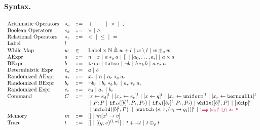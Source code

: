 \documentclass[a4paper,11pt]{article}
\begin{document}
\paragraph{Syntax.}
\[
\begin{array}{llll}
 \mbox{Arithmatic Operators} & *_a & ::= & + ~|~ - ~|~ \times 
%
~|~ \div \\  
  \mbox{Boolean Operators} & *_b & ::= & \lor \sep \land \\
   \mbox{Relational Operators} & *_r & ::= & < ~|~ \leq ~|~ = \\  
 \mbox{Label} & l & & \\ 
 \mbox{While Map} & w & \in & \mbox{Label} \times \mathbb{N} \triangleq w +l \sep w \setminus l \sep w \oplus_\rho w \\
\mbox{AExpr} & \aexpr & ::= & 
	n ~|~ x ~|~ \aexpr *_a \aexpr ~|~ {[] ~|~ [\aexpr_0, \dots, \aexpr_i] \sep \aexpr \times \aexpr } \\
\mbox{BExpr} & \bexpr & ::= & 
	\etrue ~|~ \efalse  ~|~ \neg \bexpr
	 ~|~ \bexpr *_b \bexpr
	~|~ \aexpr *_r \aexpr \\
\mbox{Deterministic Expr} & \expr_d & ::=	& \aexpr \sep \bexpr \\
\mbox{Randomized AExpr} & \aexpr_r & ::= & 
	 x_r \sep n \sep  \aexpr_r *_a \aexpr_r \\
\mbox{Randomized BExpr} & \bexpr_r & ::= & 
\neg \bexpr_r
	 ~|~ \bexpr_r *_b \bexpr_r
	~|~ \aexpr_r *_r \aexpr_r \\
\mbox{Randomized Expr} & \expr_r & ::=	& \expr_d \sep \aexpr_r \sep \bexpr_r \\
\mbox{Command} & C & ::= &   [\assign x {\expr_d}]^{l} \sep [\assign {x_r} {\expr_r}]^{l} \sep  [\assign x q]^{l} \sep  [\assign {x_r} \uniform ]^{l} \sep   [\assign {x_r} \bernoulli]^{l} 
\\
& & & ~|~  \command ; \command  ~|~ \eif_D ([\bexpr]^{l}, \command_1, \command_2) \sep  \eif_R ([\bexpr_r]^{l}, \command_1, \command_2) 
	~|~ \ewhile([\bexpr]^{l}, \command) ~|~ [\eskip]^{l} \\
& & &	~|~ {\eunfold{[\bexpr]^{l}}{\command} \sep [\eswitch( \expr, x, (v_i \to  q_i))]^{l}} \sep \jl{\eloop ~ [\valr_N]^{l} ~ (f) ~ \edo ~ \command }
	\\
\mbox{Memory} & m & ::= & [] ~|~ m[x^{l} \to v] \\
%
\mbox{Trace} & t & ::= & [] ~|~ [(q, v)^{(l, w) }] ~|~ t ++ t 
~|~ t \oplus_{\rho} t
\end{array}
\]
\end{document}
